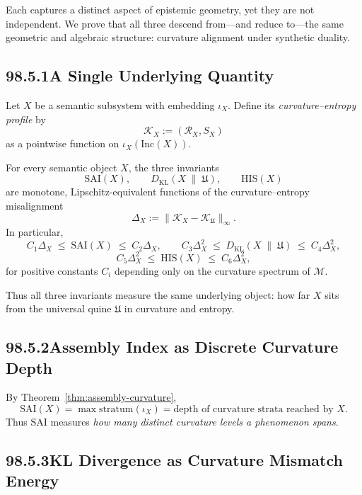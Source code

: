 Each captures a distinct aspect of epistemic geometry, yet they are not
independent.  
We prove that all three descend from—and reduce to—the same geometric and
algebraic structure: curvature alignment under synthetic duality.

\subsection*{98.5.1\quad A Single Underlying Quantity}

Let $X$ be a semantic subsystem with embedding $\iota_X$.
Define its \emph{curvature–entropy profile} by
\[
\mathcal{K}_X := (\mathcal{R}_X, S_X)
\]
as a pointwise function on $\iota_X(\mathrm{Inc}(X))$.

\begin{theorem}
\label{thm:unified-epistemic-structure}
For every semantic object $X$, the three invariants
\[
\mathrm{SAI}(X),\qquad
D_{\mathrm{KL}}(X \;\|\; \mathfrak{U}),\qquad
\mathrm{HIS}(X)
\]
are monotone, Lipschitz-equivalent functions of the curvature–entropy
misalignment
\[
\Delta_X := \|\mathcal{K}_X - \mathcal{K}_{\mathfrak{U}}\|_{\infty}.
\]
In particular,
\[
C_1 \Delta_X
  \;\le\;
  \mathrm{SAI}(X)
  \;\le\;
C_2 \Delta_X,
\qquad
C_3 \Delta_X^2
  \;\le\;
  D_{\mathrm{KL}}(X\;\|\; \mathfrak{U})
  \;\le\;
C_4 \Delta_X^2,
\]
\[
C_5 \Delta_X^2
  \;\le\;
  \mathrm{HIS}(X)
  \;\le\;
C_6 \Delta_X^2,
\]
for positive constants $C_i$ depending only on the curvature spectrum of
$\mathcal{M}$.
\end{theorem}

Thus all three invariants measure the same underlying object:
how far $X$ sits from the universal quine $\mathfrak{U}$ in curvature and
entropy.

\subsection*{98.5.2\quad Assembly Index as Discrete Curvature Depth}

By Theorem~\ref{thm:assembly-curvature},
\[
\mathrm{SAI}(X)
  = \max\mathrm{stratum}(\iota_X)
  = \text{depth of curvature strata reached by $X$}.
\]
Thus $\mathrm{SAI}$ measures \emph{how many distinct curvature levels a
phenomenon spans}.

\subsection*{98.5.3\quad KL Divergence as Curvature Mismatch Energy}

